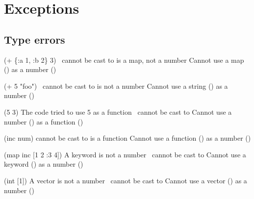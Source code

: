 \documentclass[12pt]{article}
\begin{document}




\appendix
\section{Exceptions}
\label{app:exceptions}

\subsection{Type errors}
\begin{exceptiontable}
{(+ \{:a 1, :b 2\} 3)}
{\clpam~cannot be cast to \jlnum}
{\cce}
{ is a map, not a number}
{\cce}
{Cannot use a map (\clpam) as a number (\jlnum)}

{(+ 5 "foo")}
{\jlstring~cannot be cast to \jlnum}
{\cce}
{ is not a number}
{\cce}
{Cannot use a string (\jlstring) as a number (\jlnum)}

{(5 3)}
{The code tried to use 5 as a function}
{\cce}
{\jllong~cannot be cast to \clifn}
{\cce}
{Cannot use a number (\jllong) as a function (\clifn)}

{(inc num)}
{ cannot be cast to \jlnum}
{\cce}
{ is a function}
{\cce}
{Cannot use a function () as a number (\jlnum)}

{(map inc [1 2 :3 4])}
{A keyword is not a number}
{\cce}
{\clkeyword~cannot be cast to \jlnum}
{\cce}
{Cannot use a keyword (\clkeyword) as a number (\jlnum)}

{(int [1])}
{A vector is not a number}
{\cce}
{\clpv~cannot be cast to \jlchar}
{\cce}
{Cannot use a vector (\clpv) as a number (\jlnum)}
\end{exceptiontable}
\end{document}
